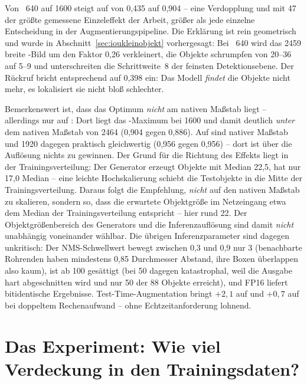 Von ~640 auf 1600 steigt \mAPfifty{} auf  von 0,435 auf
0,904 -- eine Verdopplung und mit 47\PP{} der größte gemessene Einzeleffekt der
Arbeit, größer als jede einzelne Entscheidung in der Augmentierungspipeline. Die
Erklärung ist rein geometrisch und wurde in
Abschnitt~\ref{sec:ioukleinobjekt} vorhergesagt: Bei ~640 wird das
2459\px{} breite -Bild um den Faktor 0,26 verkleinert, die Objekte
schrumpfen von 20--36 auf 5--9\px{} und unterschreiten die Schrittweite~8 der
feinsten Detektionsebene. Der Rückruf bricht entsprechend auf 0,398 ein: Das
Modell \emph{findet} die Objekte nicht mehr, es lokalisiert sie nicht bloß
schlechter.

Bemerkenswert ist, dass das Optimum \emph{nicht} am nativen Maßstab liegt --
allerdings nur auf : Dort liegt das \mAPfifty{}-Maximum bei 1600 und
damit deutlich \emph{unter} dem nativen Maßstab von 2464 (0,904 gegen 0,886).
Auf  sind nativer Maßstab und 1920 dagegen praktisch gleichwertig
(0,956 gegen 0,956) -- dort ist über die Auflösung nichts zu gewinnen. Der Grund
für die Richtung des Effekts liegt in der Trainingsverteilung: Der Generator erzeugt
Objekte mit Median 22,5\px{},  hat nur 17,0\px{} Median -- eine
leichte Hochskalierung schiebt die
Testobjekte in die Mitte der Trainingsverteilung. Daraus folgt die Empfehlung,
\emph{nicht} auf den nativen Maßstab zu skalieren, sondern so, dass die erwartete
Objektgröße im Netzeingang etwa dem Median der Trainingsverteilung entspricht --
hier rund 22\px. Der Objektgrößenbereich des Generators und die
Inferenzauflösung sind damit \emph{nicht} unabhängig voneinander wählbar. Die
übrigen Inferenzparameter sind dagegen unkritisch: Der NMS-Schwellwert bewegt zwischen
0,3 und 0,9 nur 3\PP{} (benachbarte Rohrenden haben mindestens 0,85 Durchmesser
Abstand, ihre Boxen überlappen also kaum),  ist ab 100 gesättigt
(bei 50 dagegen katastrophal, weil die Ausgabe hart abgeschnitten wird und nur
50 der 88 Objekte erreicht), und FP16 liefert bitidentische
Ergebnisse. Test-Time-Augmentation bringt $+2{,}1$\PP{} auf  und
$+0{,}7$ auf  bei doppeltem Rechenaufwand \parencite{shanmugam2021} --
ohne Echtzeitanforderung lohnend.

\section{Das Experiment: Wie viel Verdeckung in den Trainingsdaten?}
\label{sec:ablation}

